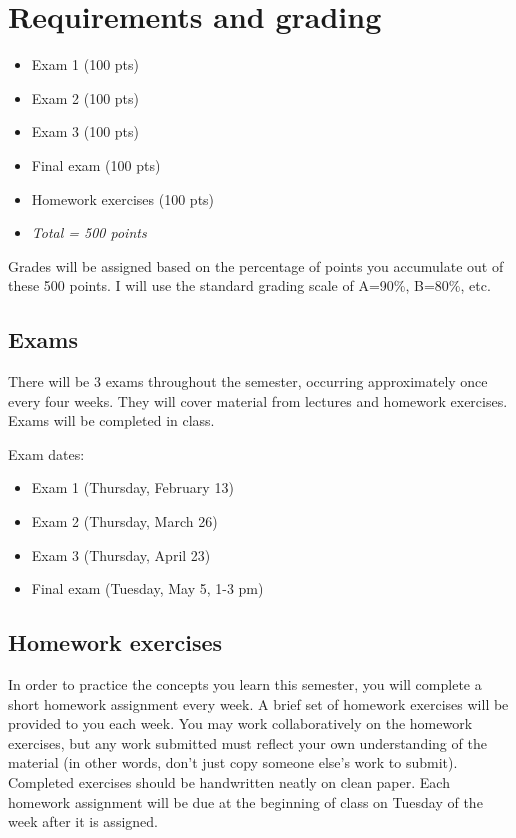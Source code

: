 \documentclass[10pt]{article}
\begin{document}
\section*{Requirements and grading}
\label{sec:org5d85a86}
\begin{itemize}
\item Exam 1 (100 pts)
\item Exam 2 (100 pts)
\item Exam 3 (100 pts)
\item Final exam (100 pts)
\item Homework exercises (100 pts)
\item \emph{Total = 500 points}
\end{itemize}

Grades will be assigned based on the percentage of points you accumulate out of these 500 points.  I will use the standard grading scale of A=90\%, B=80\%, etc.

\subsection*{Exams}
\label{sec:org22ee7ec}
There will be 3 exams throughout the semester, occurring approximately once every four weeks.  They will cover material from lectures and homework exercises. Exams will be completed in class.

Exam dates:

\begin{itemize}
\item Exam 1 (Thursday, February 13)
\item Exam 2 (Thursday, March 26)
\item Exam 3 (Thursday, April 23)
\item Final exam (Tuesday, May 5, 1-3 pm)
\end{itemize}

\subsection*{Homework exercises}
\label{sec:org3bf6f3c}
In order to practice the concepts you learn this semester, you will complete a short homework assignment every week. A brief set of homework exercises will be provided to you each week. You may work collaboratively on the homework exercises, but any work submitted must reflect your own understanding of the material (in other words, don't just copy someone else's work to submit). Completed exercises should be handwritten neatly on clean paper. Each homework assignment will be due at the beginning of class on Tuesday of the week after it is assigned.
\end{document}
